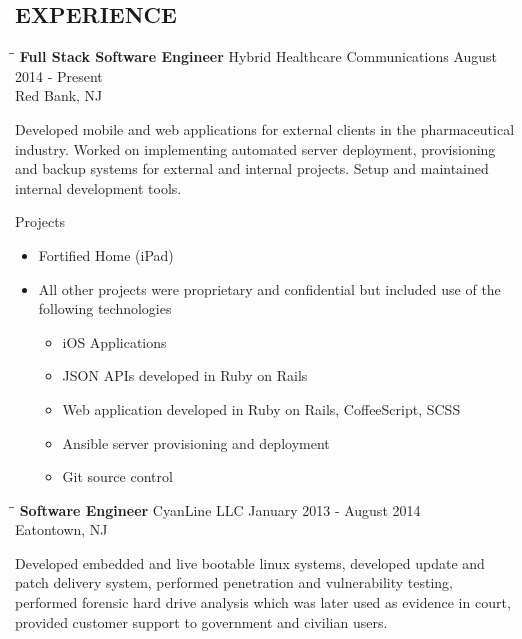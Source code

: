 \documentclass{res}
\begin{document}
\begin{resume}
\section{EXPERIENCE}
   \vspace{-0.1in}	
   \begin{tabbing}
   \hspace{2.3in}\= \hspace{2.6in}\= \kill %
    {\bf Full Stack Software Engineer} \>Hybrid Healthcare Communications     \>August 2014 - Present\\
                             \>Red Bank, NJ
   \end{tabbing}\vspace{-20pt}      %
    Developed mobile and web applications for external clients in the pharmaceutical industry.
    Worked on implementing automated server deployment, provisioning and backup systems for external and internal projects.
    Setup and maintained internal development tools.

    Projects
    \begin{itemize}
        \item Fortified Home (iPad)
        \item All other projects were proprietary and confidential but included use of the following technologies
        \begin{itemize}
            \item iOS Applications
            \item JSON APIs developed in Ruby on Rails
            \item Web application developed in Ruby on Rails, CoffeeScript, SCSS
            \item Ansible server provisioning and deployment
            \item Git source control
        \end{itemize}
    \end{itemize}

   \begin{tabbing}
   \hspace{2.3in}\= \hspace{2.6in}\= \kill %
    {\bf Software Engineer} \>CyanLine LLC     \>January 2013 - August 2014\\
                             \>Eatontown, NJ
   \end{tabbing}\vspace{-20pt}      %
    Developed embedded and live bootable linux systems, 
    developed update and patch delivery system,
    performed penetration and vulnerability testing,
    performed forensic hard drive analysis which was later used as evidence in court,
    provided customer support to government and civilian users.


\end{resume}
\end{document}
